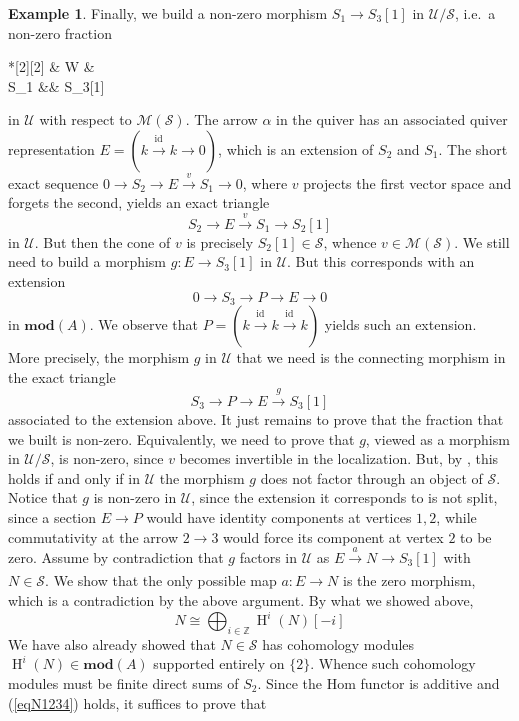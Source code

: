 \documentclass[11pt,reqno,a4paper]{amsart}
\theoremstyle{definition}
\newtheorem{example}[theorem]{Example}
\theoremstyle{remark}
\newcommand{\refs}[1]{\textup{(}\ref{#1}\textup{)}}
\renewcommand{\S}{\mathcal{S}}
\newcommand{\U}{\mathcal{U}}
\newcommand{\0}{\mathbf{0}}
\renewcommand{\1}{\mathbf{1}}
\renewcommand{\mod}{\mathbf{mod}}
\def\:{\colon}
\newcommand{\id}[1]{\operatorname{id}_{#1}}
\newcommand{\aar}[2][]{\xrightarrow[#1]{#2}}
\begin{document}
\begin{example}
    Finally, we build a non-zero morphism $S_1\to S_3[1]$ in $\U/\S$, i.e.\ a non-zero fraction \begin{cd}*[2][2] \& W \& \\[-2ex]
	S_1 \&\& S_3[1]
	\arrow["v"', from=1-2, to=2-1]
	\arrow["g", from=1-2, to=2-3]\end{cd}
    in $\U$ with respect to $\mathcal{M}(\S)$. The arrow $\alpha$ in the quiver has an associated quiver representation $E=(k\aar{\id{}} k \to 0)$, which is an extension of $S_2$ and $S_1$. The short exact sequence $0 \to S_2 \to E \xrightarrow{v} S_1 \to 0$, where $v$ projects the first vector space and forgets the second, yields an exact triangle
    $$S_2 \to E \xrightarrow{v} S_1 \to S_2[1]$$
    in $\U$. But then the cone of $v$ is precisely $S_2[1]\in \S$, whence $v\in \mathcal{M}(\S)$. We still need to build a morphism $g\:E\to S_3[1]$ in $\U$. But this corresponds with an extension
    $$0 \to S_3 \to P \to E \to 0$$
    in $\mod(A)$. We observe that $P=(k\aar{\id{}} k \aar{\id{}} k)$ yields such an extension. More precisely, the morphism $g$ in $\U$ that we need is the connecting morphism in the exact triangle
    $$S_3 \to P \to E \xrightarrow{g} S_3[1]$$
    associated to the extension above. It just remains to prove that the fraction  that we built is non-zero. Equivalently, we need to prove that $g$, viewed as a morphism in $\U/\S$, is non-zero, since $v$ becomes invertible in the localization. But, by \cite[Lemma 13.6.7]{StacksTri}, this holds if and only if in $\U$ the morphism $g$ does not factor through an object of $\S$. Notice that $g$ is non-zero in $\U$, since the extension it corresponds to is not split, since a section $E\to P$ would have identity components at vertices $1,2$, while commutativity at the arrow $2\to3$ would force its component at vertex $2$ to be zero. Assume by contradiction that $g$ factors in $\U$ as $E\aar{a} N\to S_3[1]$ with $N\in \S$. We show that the only possible map $a\:E\to N$ is the zero morphism, which is a contradiction by the above argument. By what we showed above,
    \begin{equation}\label{eqN1234}
        N \cong \bigoplus_{i \in \mathbb{Z}} \operatorname{H}^i(N)[-i]
    \end{equation}
    We have also already showed that $N\in \S$ has cohomology modules $\operatorname{H}^i(N)\in \mod(A)$ supported entirely on $\{2\}$. Whence such cohomology modules must be finite direct sums of $S_2$. Since the Hom functor is additive and \refs{eqN1234} holds, it suffices to prove that

\end{example}
\end{document}
